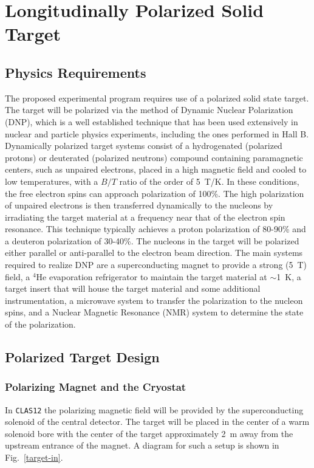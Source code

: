\section{Longitudinally Polarized Solid Target}

\subsection{Physics Requirements}

The proposed experimental program requires use of a polarized solid state 
target.  The target will be polarized via the method of Dynamic Nuclear 
Polarization (DNP), which is a well established technique that has been 
used extensively in nuclear and particle physics experiments, including 
the ones performed in Hall B.  Dynamically polarized target systems 
consist of a hydrogenated (polarized protons) or deuterated (polarized 
neutrons) compound containing paramagnetic centers, such as unpaired 
electrons, placed in a high magnetic field and cooled to low temperatures, 
with a $B/T$ ratio of the order of 5~T/K.  In these conditions, the free 
electron spins can approach polarization of 100\%. The high polarization 
of unpaired electrons is then transferred dynamically to the nucleons by 
irradiating the target material at a frequency near that of the electron 
spin resonance. This technique typically achieves a proton polarization of 
80-90\% and a deuteron polarization of 30-40\%.  The nucleons in the 
target will be polarized either parallel or anti-parallel to the electron 
beam direction.  The main systems required to realize DNP are a 
superconducting magnet to provide a strong (5~T) field, a $^4$He evaporation 
refrigerator to maintain the target material at $\sim$1~K, a target insert 
that will house the target material and some additional instrumentation, a 
microwave system to transfer the polarization to the nucleon spins, and a 
Nuclear Magnetic Resonance (NMR) system to determine the state of the 
polarization.

\subsection{Polarized Target Design}

\subsubsection{Polarizing Magnet and the Cryostat}

In {\tt CLAS12} the polarizing magnetic field will be provided by the 
superconducting solenoid of the central detector. The target will be 
placed in the center of a warm solenoid bore with the center of the target 
approximately 2~m away from the upstream entrance of the magnet.  A diagram 
for such a setup is shown in Fig.~\ref{target-in}.

